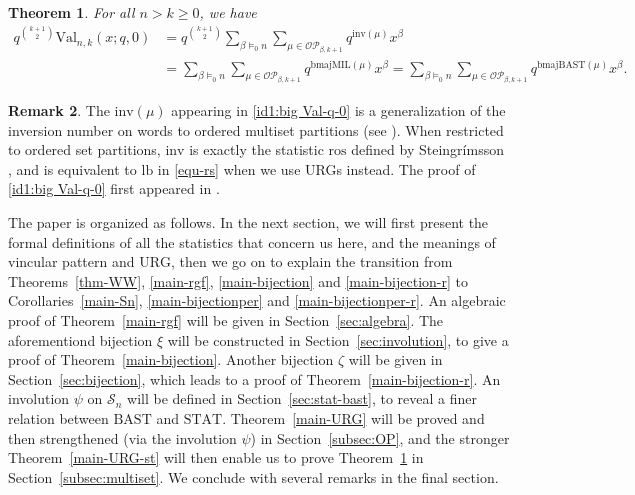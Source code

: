 \documentclass[12pt]{amsart}
\numberwithin{equation}{section}
\theoremstyle{plain}
\newtheorem{theorem}{Theorem}[section]
\theoremstyle{definition}
\newtheorem{remark}[theorem]{Remark}
\def\inv{\mathrm{inv}}
\def\STAT{\mathrm{STAT}}
\def\BAST{\mathrm{BAST}}
\def\bmajMIL{\mathrm{bmajMIL}}
\def\bmajBAST{\mathrm{bmajBAST}}
\def\Val{\mathrm{Val}}
\def\ros{\mathrm{ros}}
\def\lb{\mathrm{lb}}
\def\SS{\mathcal{S}}
\def\OP{\mathcal{OP}}
\begin{document}
\begin{theorem}\label{main-OMP}
For all $n>k\ge0$, we have
\begin{align}\label{id1:big Val-q-0}
q^{\binom{k+1}{2}}\Val_{n,k}(x;q,0)&=q^{\binom{k+1}{2}}\sum_{\beta\models_0 n}\sum_{\mu\in\OP_{\beta,k+1}}q^{\inv(\mu)}x^{\beta}\\
&=\sum_{\beta\models_0 n}\sum_{\mu\in\OP_{\beta,k+1}}q^{\bmajMIL(\mu)}x^{\beta}=\sum_{\beta\models_0 n}\sum_{\mu\in\OP_{\beta,k+1}}q^{\bmajBAST(\mu)}x^{\beta}.\label{id2:big Val-q-0}
\end{align}
\end{theorem}
\begin{remark}\label{rmk:inv}
The $\inv(\mu)$ appearing in \eqref{id1:big Val-q-0} is a generalization of the inversion number on words to ordered multiset partitions (see \cite{Wils,HRW,RW,Rh}). When restricted to ordered set partitions, $\inv$ is exactly the statistic $\ros$ defined by Steingr\'imsson \cite{Ste}, and is equivalent to $\lb$ in \eqref{equ-rs} when we use URGs instead. The proof of \eqref{id1:big Val-q-0} first appeared in \cite[Prop.~4.1, Eq.~(49)]{HRW}.
\end{remark}

The paper is organized as follows. In the next section, we will first present the formal definitions of all the statistics that concern us here, and the meanings of vincular pattern and $\mathrm{URG}$, then we go on to explain the transition from Theorems~\ref{thm-WW}, \ref{main-rgf}, \ref{main-bijection} and \ref{main-bijection-r} to Corollaries~\ref{main-Sn}, \ref{main-bijectionper} and \ref{main-bijectionper-r}. An algebraic proof of Theorem~\ref{main-rgf} will be given in Section~\ref{sec:algebra}. The aforementiond bijection $\xi$ will be constructed in Section~\ref{sec:involution}, to give a proof of Theorem~\ref{main-bijection}.
Another bijection $\zeta$ will be given in Section~\ref{sec:bijection}, which leads to a proof of Theorem~\ref{main-bijection-r}. An involution $\psi$ on $\SS_n$ will be defined in Section~\ref{sec:stat-bast}, to reveal a finer relation between $\BAST$ and $\STAT$. Theorem~\ref{main-URG} will be proved and then strengthened (via the involution $\psi$) in Section~\ref{subsec:OP}, and the stronger Theorem~\ref{main-URG-st} will then enable us to prove Theorem~\ref{main-OMP} in Section~\ref{subsec:multiset}. We conclude with several remarks in the final section.

\end{document}
